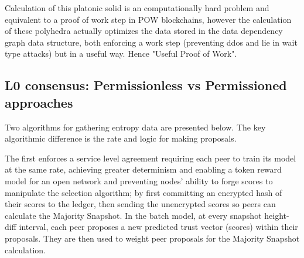 \documentclass{article}
\theoremstyle{definition}
\theoremstyle{remark}
\theoremstyle{plain}
\begin{document}
Calculation of this platonic solid is an computationally hard problem and equivalent to a proof of work step in POW blockchains, however the calculation of these polyhedra actually optimizes the data stored in the data dependency graph data structure, both enforcing a work step (preventing ddos and lie in wait type attacks) but in a useful way. Hence "Useful Proof of Work".



\subsection {L0 consensus: Permissionless vs Permissioned approaches}
Two algorithms for gathering entropy data are presented below. The key algorithmic difference is the rate and logic for making proposals. 

The first enforces a service level agreement requiring each peer to train its model at the same rate, achieving greater determinism and enabling a token reward model for an open network and preventing nodes' ability to forge scores to manipulate the selection algorithm; by first committing an encrypted hash of their scores to the ledger, then sending the unencrypted scores so peers can calculate the Majority Snapshot. In the batch model, at every snapshot height-diff interval, each peer proposes a new predicted trust vector (scores) within their proposals. They are then used to weight peer proposals for the Majority Snapshot calculation.
\end{document}
